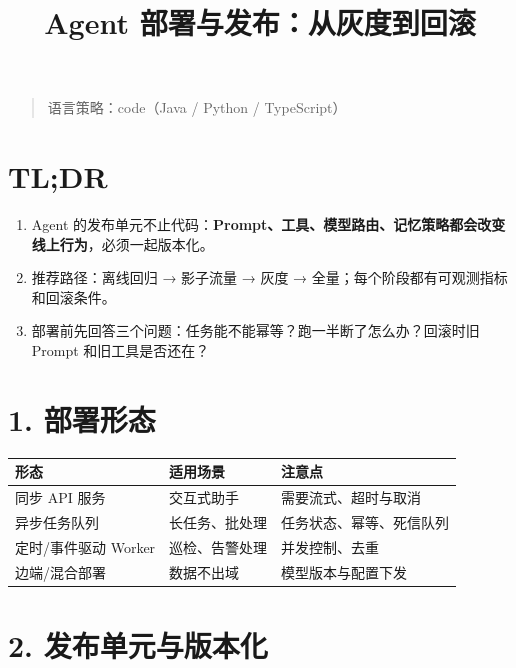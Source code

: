 \documentclass[9pt,a4paper,twocolumn]{ctexart}
\begin{document}
\title{Agent 部署与发布：从灰度到回滚}
\date{}
\maketitle
{}

\begin{quote}
语言策略：code（Java / Python / TypeScript）
\end{quote}



\section*{TL;DR}

\begin{enumerate}[itemsep=1pt, topsep=2pt]
  \item Agent 的发布单元不止代码：\textbf{Prompt、工具、模型路由、记忆策略都会改变线上行为}，必须一起版本化。
  \item 推荐路径：离线回归 → 影子流量 → 灰度 → 全量；每个阶段都有可观测指标和回滚条件。
  \item 部署前先回答三个问题：任务能不能幂等？跑一半断了怎么办？回滚时旧 Prompt 和旧工具是否还在？
\end{enumerate}


\section*{1. 部署形态}

{\footnotesize
\begin{tabular}{|p{}|p{}|p{}|}
\hline
\textbf{形态} & \textbf{适用场景} & \textbf{注意点} \\
\hline
同步 API 服务 & 交互式助手 & 需要流式、超时与取消 \\
\hline
异步任务队列 & 长任务、批处理 & 任务状态、幂等、死信队列 \\
\hline
定时/事件驱动 Worker & 巡检、告警处理 & 并发控制、去重 \\
\hline
边端/混合部署 & 数据不出域 & 模型版本与配置下发 \\
\hline
\end{tabular}
}



\section*{2. 发布单元与版本化}
\end{document}
